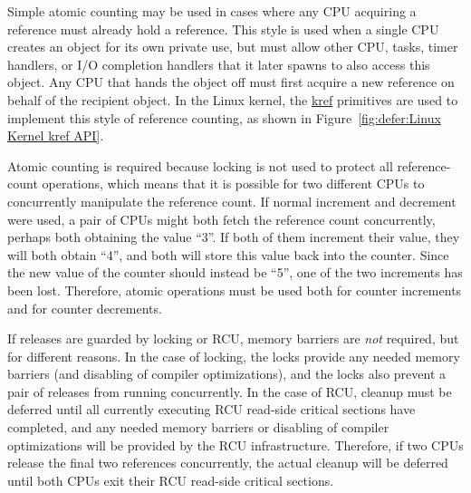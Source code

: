 Simple atomic counting may be used in cases where any CPU acquiring
a reference must already hold a reference.
This style is used when a single CPU creates an object for its
own private use, but must allow other CPU, tasks, timer handlers,
or I/O completion handlers that it later spawns to also access this object.
Any CPU that hands the object off must first acquire a new reference
on behalf of the recipient object.
In the Linux kernel, the \url{kref} primitives are used to implement
this style of reference counting, as shown in
Figure~\ref{fig:defer:Linux Kernel kref API}.

Atomic counting is required
because locking is not used to protect all reference-count operations,
which means that it is possible for two different CPUs to concurrently
manipulate the reference count.
If normal increment and decrement were used, a pair of CPUs might both
fetch the reference count concurrently, perhaps both obtaining
the value ``3''.
If both of them increment their value, they will both obtain ``4'',
and both will store this value back into the counter.
Since the new value of the counter should instead be ``5'', one
of the two increments has been lost.
Therefore, atomic operations must be used both for counter increments
and for counter decrements.

If releases are guarded by locking or RCU,
memory barriers are \emph{not} required, but for different reasons.
In the case of locking, the locks provide any needed memory barriers
(and disabling of compiler optimizations), and the locks also
prevent a pair of releases from running concurrently.
In the case of RCU, cleanup must be deferred until all currently
executing RCU read-side critical sections have completed, and
any needed memory barriers or disabling of compiler optimizations
will be provided by the RCU infrastructure.
Therefore, if two CPUs release the final two references concurrently,
the actual cleanup will be deferred until both CPUs exit their
RCU read-side critical sections.

 \QuickQuizEnd

